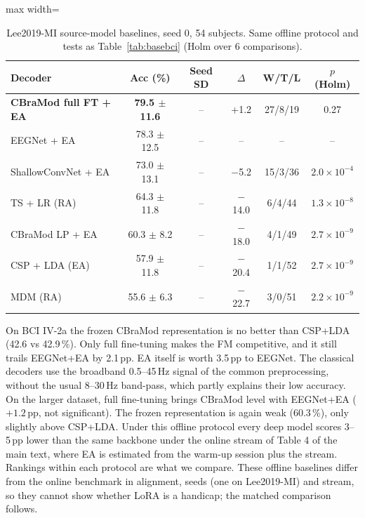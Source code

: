 \documentclass[preprint,12pt]{elsarticle}
\newcommand{\rev}[1]{#1}
\newcommand{\revfloat}{}
\begin{document}
\begin{table}[!htbp]
\centering
\caption{Lee2019-MI source-model baselines, seed 0, 54 subjects. Same offline protocol and tests as Table~\ref{tab:basebci} (Holm over 6 comparisons).}
\label{tab:baselee}
\revfloat
\setlength{\tabcolsep}{2.2pt}
\begin{adjustbox}{max width=\textwidth}
\begin{tabular}{@{}lccccc@{}}
\toprule
Decoder & Acc (\%) & Seed SD & $\Delta$ & W/T/L & $p$ (Holm) \\
\midrule
\textbf{CBraMod full FT + EA} & \textbf{79.5 $\pm$ 11.6} & -- & +1.2 & 27/8/19 & 0.27 \\
EEGNet + EA & 78.3 $\pm$ 12.5 & -- & -- & -- & -- \\
ShallowConvNet + EA & 73.0 $\pm$ 13.1 & -- & $-$5.2 & 15/3/36 & $2.0{\times}10^{-4}$ \\
TS + LR (RA) & 64.3 $\pm$ 11.8 & -- & $-$14.0 & 6/4/44 & $1.3{\times}10^{-8}$ \\
CBraMod LP + EA & 60.3 $\pm$ 8.2 & -- & $-$18.0 & 4/1/49 & $2.7{\times}10^{-9}$ \\
CSP + LDA (EA) & 57.9 $\pm$ 11.8 & -- & $-$20.4 & 1/1/52 & $2.7{\times}10^{-9}$ \\
MDM (RA) & 55.6 $\pm$ 6.3 & -- & $-$22.7 & 3/0/51 & $2.2{\times}10^{-9}$ \\
\bottomrule
\end{tabular}
\end{adjustbox}
\end{table}


On BCI IV-2a the frozen CBraMod representation is no better than CSP+LDA (42.6 vs 42.9\,\%). Only full fine-tuning makes the FM competitive, and it still trails EEGNet+EA by 2.1\,pp. EA itself is worth 3.5\,pp to EEGNet. \rev{The classical decoders use the broadband 0.5--45\,Hz signal of the common preprocessing, without the usual 8--30\,Hz band-pass, which partly explains their low accuracy.} On the larger dataset, full fine-tuning brings CBraMod level with EEGNet+EA ($+1.2$\,pp, not significant). The frozen representation is again weak (60.3\,\%), only slightly above CSP+LDA. Under this offline protocol every deep model scores 3--5\,pp lower than the same backbone under the online stream of Table 4 of the main text, where EA is estimated from the warm-up session plus the stream. Rankings within each protocol are what we compare. \rev{These offline baselines differ from the online benchmark in alignment, seeds (one on Lee2019-MI) and stream, so they cannot show whether LoRA is a handicap; the matched comparison follows.}
\end{document}
